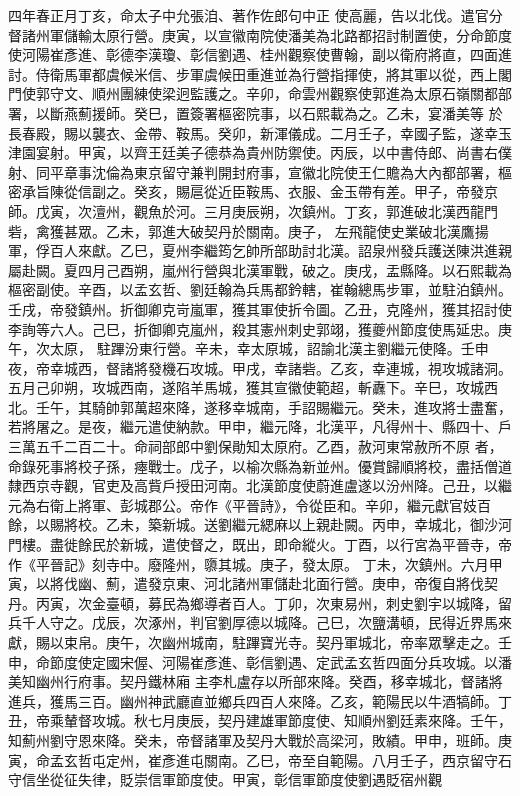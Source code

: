 \begin{pinyinscope}
 四年春正月丁亥，命太子中允張洎、著作佐郎句中正
 使高麗，告以北伐。遣官分督諸州軍儲輸太原行營。庚寅，以宣徽南院使潘美為北路都招討制置使，分命節度使河陽崔彥進、彰德李漢瓊、彰信劉遇、桂州觀察使曹翰，副以衛府將直，四面進討。侍衛馬軍都虞候米信、步軍虞候田重進並為行營指揮使，將其軍以從，西上閣門使郭守文、順州團練使梁迥監護之。辛卯，命雲州觀察使郭進為太原石嶺關都部署，以斷燕薊援師。癸巳，置簽署樞密院事，以石熙載為之。乙未，宴潘美等
 於長春殿，賜以襲衣、金帶、鞍馬。癸卯，新渾儀成。二月壬子，幸國子監，遂幸玉津園宴射。甲寅，以齊王廷美子德恭為貴州防禦使。丙辰，以中書侍郎、尚書右僕射、同平章事沈倫為東京留守兼判開封府事，宣徽北院使王仁贍為大內都部署，樞密承旨陳從信副之。癸亥，賜扈從近臣鞍馬、衣服、金玉帶有差。甲子，帝發京師。戊寅，次澶州，觀魚於河。三月庚辰朔，次鎮州。丁亥，郭進破北漢西龍門砦，禽獲甚眾。乙未，郭進大破契丹於關南。庚子，
 左飛龍使史業破北漢鷹揚軍，俘百人來獻。乙巳，夏州李繼筠乞帥所部助討北漢。詔泉州發兵護送陳洪進親屬赴闕。夏四月己酉朔，嵐州行營與北漢軍戰，破之。庚戌，盂縣降。以石熙載為樞密副使。辛酉，以孟玄哲、劉廷翰為兵馬都鈐轄，崔翰總馬步軍，並駐泊鎮州。壬戌，帝發鎮州。折御卿克岢嵐軍，獲其軍使折令圖。乙丑，克隆州，獲其招討使李詢等六人。己巳，折御卿克嵐州，殺其憲州刺史郭翊，獲夔州節度使馬延忠。庚午，次太原，
 駐蹕汾東行營。辛未，幸太原城，詔諭北漢主劉繼元使降。壬申夜，帝幸城西，督諸將發機石攻城。甲戌，幸諸砦。乙亥，幸連城，視攻城諸洞。五月己卯朔，攻城西南，遂陷羊馬城，獲其宣徽使範超，斬纛下。辛巳，攻城西北。壬午，其騎帥郭萬超來降，遂移幸城南，手詔賜繼元。癸未，進攻將士盡奮，若將屠之。是夜，繼元遣使納款。甲申，繼元降，北漢平，凡得州十、縣四十、戶三萬五千二百二十。命祠部郎中劉保勛知太原府。乙酉，赦河東常赦所不原
 者，命錄死事將校子孫，瘞戰士。戊子，以榆次縣為新並州。優賞歸順將校，盡括僧道隸西京寺觀，官吏及高貲戶授田河南。北漢節度使蔚進盧遂以汾州降。己丑，以繼元為右衛上將軍、彭城郡公。帝作《平晉詩》，令從臣和。辛卯，繼元獻官妓百餘，以賜將校。乙未，築新城。送劉繼元緦麻以上親赴闕。丙申，幸城北，御沙河門樓。盡徙餘民於新城，遣使督之，既出，即命縱火。丁酉，以行宮為平晉寺，帝作《平晉記》刻寺中。廢隆州，隳其城。庚子，發太原。
 丁未，次鎮州。六月甲寅，以將伐幽、薊，遣發京東、河北諸州軍儲赴北面行營。庚申，帝復自將伐契丹。丙寅，次金臺頓，募民為鄉導者百人。丁卯，次東易州，刺史劉宇以城降，留兵千人守之。戊辰，次涿州，判官劉厚德以城降。己巳，次鹽溝頓，民得近界馬來獻，賜以束帛。庚午，次幽州城南，駐蹕寶光寺。契丹軍城北，帝率眾擊走之。壬申，命節度使定國宋偓、河陽崔彥進、彰信劉遇、定武孟玄哲四面分兵攻城。以潘美知幽州行府事。契丹鐵林廂
 主李札盧存以所部來降。癸酉，移幸城北，督諸將進兵，獲馬三百。幽州神武廳直並鄉兵四百人來降。乙亥，範陽民以牛酒犒師。丁丑，帝乘輦督攻城。秋七月庚辰，契丹建雄軍節度使、知順州劉廷素來降。壬午，知薊州劉守恩來降。癸未，帝督諸軍及契丹大戰於高梁河，敗績。甲申，班師。庚寅，命孟玄哲屯定州，崔彥進屯關南。乙巳，帝至自範陽。八月壬子，西京留守石守信坐從征失律，貶崇信軍節度使。甲寅，彰信軍節度使劉遇貶宿州觀

\end{pinyinscope}
